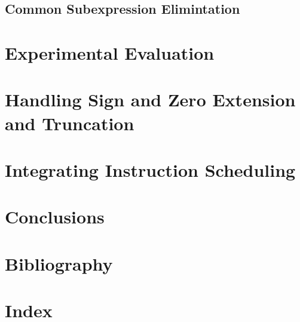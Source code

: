 \documentclass{kthdiss}
\begin{document}
\section{Common Subexpression Elimintation}

\chapter{Experimental Evaluation}

\chapter{Handling Sign and Zero Extension and Truncation}

\chapter{Integrating Instruction Scheduling}

\chapter{Conclusions}

\chapter{Bibliography}

\chapter{Index}
\end{document}
